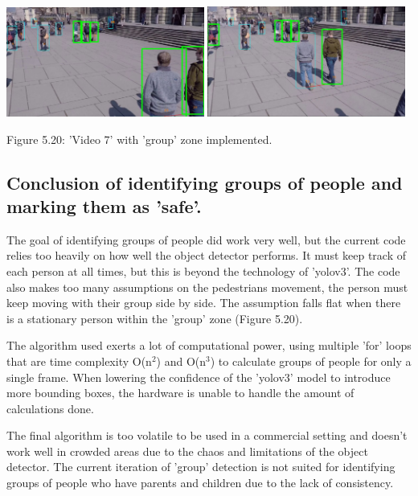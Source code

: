 \documentclass[12pt]{report}
\begin{document}
\begin{center}
	\includegraphics[width=65mm]{./images/appendix/AddingGroups.JPG}
	\includegraphics[width=65mm]{./images/appendix/AddingGroups2.JPG}
	
	{\footnotesize Figure 5.20: 'Video 7' with 'group' zone implemented.}
\end{center}

\subsection{Conclusion of identifying groups of people and marking them as 'safe'.}

The goal of identifying groups of people did work very well, but the current code relies too heavily on how well the object detector performs. It must keep track of each person at all times, but this is beyond the technology of 'yolov3'. The code also makes too many assumptions on the pedestrians movement, the person must keep moving with their group side by side. The assumption falls flat when there is a stationary person within the 'group' zone (Figure 5.20).

\vspace{2mm}

The algorithm used exerts a lot of computational power, using multiple 'for' loops that are time complexity O(n$^2$) and O(n$^3$) to calculate groups of people for only a single frame. When lowering the confidence of the 'yolov3' model to introduce more bounding boxes, the hardware is unable to handle the amount of calculations done.

\vspace{2mm}

The final algorithm is too volatile to be used in a commercial setting and doesn't work well in crowded areas due to the chaos and limitations of the object detector. The current iteration of 'group' detection is not suited for identifying groups of people who have parents and children due to the lack of consistency.
\end{document}
